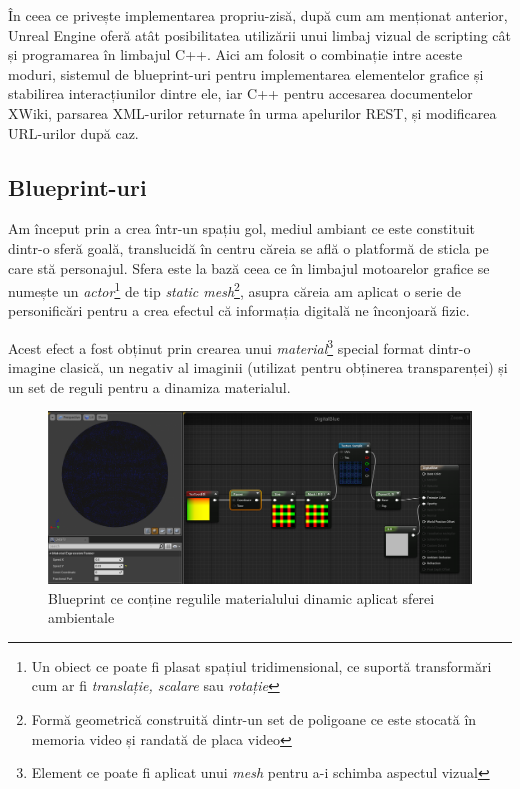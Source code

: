 În ceea ce privește implementarea propriu-zisă, după cum am menționat anterior, Unreal Engine oferă atât posibilitatea utilizării unui limbaj vizual de scripting cât și programarea în limbajul C++.
Aici am folosit o combinație intre aceste moduri, sistemul de blueprint-uri pentru implementarea elementelor grafice și stabilirea interacțiunilor dintre ele, iar C++ pentru accesarea documentelor XWiki, parsarea XML-urilor returnate în urma apelurilor REST, și modificarea URL-urilor după caz.

\subsection{Blueprint-uri}

Am început prin a crea într-un spațiu gol, mediul ambiant ce este constituit dintr-o sferă goală, translucidă în centru căreia se află o platformă de sticla pe care stă personajul.
Sfera este la bază ceea ce în limbajul motoarelor grafice se numește un \textit{actor}\footnote{Un obiect ce poate fi plasat spațiul tridimensional, ce suportă transformări cum ar fi \textit{translație, scalare} sau \textit{rotație}} de tip \textit{static mesh}\footnote{Formă geometrică construită dintr-un set de poligoane ce este stocată în memoria video și randată de placa video}, asupra căreia am aplicat o serie de personificări pentru a crea efectul că informația digitală ne înconjoară fizic.

Acest efect a fost obținut prin crearea unui \textit{material}\footnote{Element ce poate fi aplicat unui \textit{mesh} pentru a-i schimba aspectul vizual} special format dintr-o imagine clasică, un negativ al imaginii (utilizat pentru obținerea transparenței) și un set de reguli pentru a dinamiza materialul.

\begin{figure}[h]
  \centering
  \includegraphics[scale=0.33]{img/digitalBlue.png}
  \caption{Blueprint ce conține regulile materialului dinamic aplicat sferei ambientale}
\end{figure}

